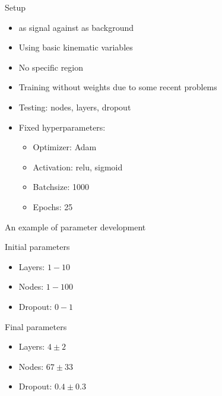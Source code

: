 \begin{frame}{Setup}
    \begin{itemize}
        \item \tZq as signal against \ttbar as background
        \item Using basic kinematic variables
        \item No specific region
        \item Training without weights due to some recent problems
        \item Testing: nodes, layers, dropout
        \item Fixed hyperparameters:
            \begin{itemize}
                \item Optimizer: Adam
                \item Activation: relu, sigmoid
                \item Batchsize: 1000
                \item Epochs: 25
            \end{itemize}
    \end{itemize}
\end{frame}

\begin{frame}{An example of parameter development}
     \begin{block}{Initial parameters}
         \begin{itemize}
             \item Layers: $1-10$
             \item Nodes: $1-100$
             \item Dropout: $0-1$
         \end{itemize}
     \end{block}
     \begin{block}{Final parameters}
         \begin{itemize}
             \item Layers: $4\pm2$
             \item Nodes: $67\pm33$
             \item Dropout: $0.4\pm0.3$
         \end{itemize}
     \end{block}
\end{frame}

